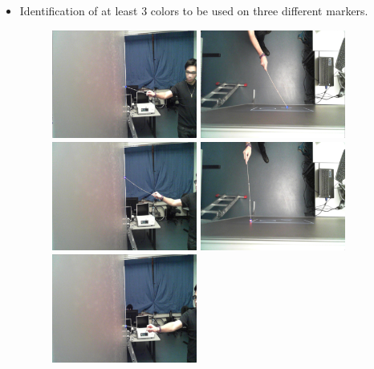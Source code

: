 \documentclass[a4paper,12pt]{article}
\begin{document}
\begin{itemize}
\item Identification of at least 3 colors to be used on three different markers.
\begin{figure}[H]
    \begin{center}
	\includegraphics[width=0.45\textwidth]{MarkerSide}
	\includegraphics[width=0.45\textwidth]{MarkerUp}
	\includegraphics[width=0.45\textwidth]{RedSide}
	\includegraphics[width=0.45\textwidth]{RedUp}
	\includegraphics[width=0.45\textwidth]{GreenSide}

\end{center}
\end{figure}
\end{itemize}
\end{document}
